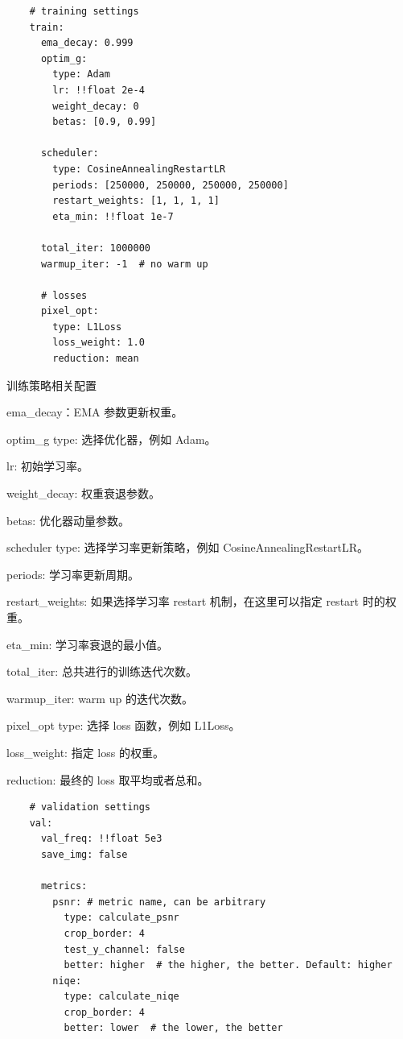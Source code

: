 \documentclass[../main.tex]{subfiles}
\begin{document}
    \begin{verbatim}
    # training settings
    train:
      ema_decay: 0.999
      optim_g:
        type: Adam
        lr: !!float 2e-4
        weight_decay: 0
        betas: [0.9, 0.99]
    
      scheduler:
        type: CosineAnnealingRestartLR
        periods: [250000, 250000, 250000, 250000]
        restart_weights: [1, 1, 1, 1]
        eta_min: !!float 1e-7
    
      total_iter: 1000000
      warmup_iter: -1  # no warm up
    
      # losses
      pixel_opt:
        type: L1Loss
        loss_weight: 1.0
        reduction: mean
	\end{verbatim}
	\begin{exampleBox}[righthand ratio=0.00, sidebyside, sidebyside align=center, lower separated=false]{训练策略相关配置}
	
	ema\_decay：EMA 参数更新权重。
	
	optim\_g type: 选择优化器，例如 Adam。
	
    lr: 初始学习率。
    
    weight\_decay: 权重衰退参数。
    
    betas: 优化器动量参数。
	
    scheduler type: 选择学习率更新策略，例如 CosineAnnealingRestartLR。
    
    periods: 学习率更新周期。
    
    restart\_weights: 如果选择学习率 restart 机制，在这里可以指定 restart 时的权重。
    
    eta\_min: 学习率衰退的最小值。
    
    total\_iter: 总共进行的训练迭代次数。
    
    warmup\_iter: warm up 的迭代次数。
    
    pixel\_opt type: 选择 loss 函数，例如 L1Loss。
    
    loss\_weight: 指定 loss 的权重。
    
    reduction: 最终的 loss 取平均或者总和。
    
    \end{exampleBox}
    \begin{verbatim}
    # validation settings
    val:
      val_freq: !!float 5e3
      save_img: false
    
      metrics:
        psnr: # metric name, can be arbitrary
          type: calculate_psnr
          crop_border: 4
          test_y_channel: false
          better: higher  # the higher, the better. Default: higher
        niqe:
          type: calculate_niqe
          crop_border: 4
          better: lower  # the lower, the better
	\end{verbatim}
\end{document}
